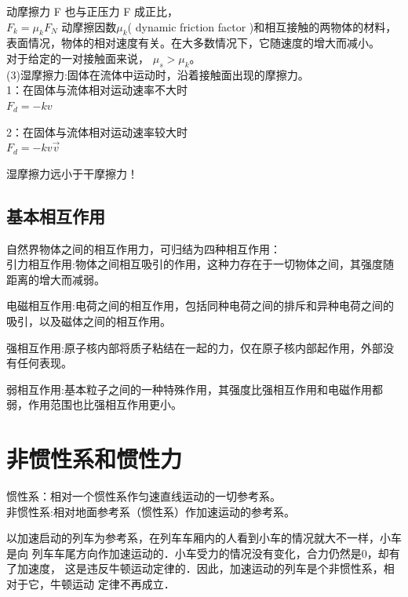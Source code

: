 动摩擦力 F 也与正压力 F 成正比，\\

$	F_{k} = \mu_{k} F_{N}  $
动摩擦因数$\mu_{k}$( dynamic friction factor )和相互接触的两物体的材料，表面情况，物体的相对速度有关。在大多数情况下，它随速度的增大而减小。\\

对于给定的一对接触面来说， $\mu_{s}> \mu_{k}$。\\

(3)湿摩擦力:固体在流体中运动时，沿着接触面出现的摩擦力。\\

1：在固体与流体相对运动速率不大时\\
$	F_{d} = -kv $

2：在固体与流体相对运动速率较大时\\
$	F_{d} =-kv\overrightarrow{v} $

湿摩擦力远小于干摩擦力！
\subsection{基本相互作用}	
自然界物体之间的相互作用力，可归结为四种相互作用：\\

引力相互作用:物体之间相互吸引的作用，这种力存在于一切物体之间，其强度随距离的增大而减弱。


电磁相互作用:电荷之间的相互作用，包括同种电荷之间的排斥和异种电荷之间的吸引，以及磁体之间的相互作用。


强相互作用:原子核内部将质子粘结在一起的力，仅在原子核内部起作用，外部没有任何表现。


弱相互作用:基本粒子之间的一种特殊作用，其强度比强相互作用和电磁作用都弱，作用范围也比强相互作用更小。



\section{非惯性系和惯性力}

\begin{definition}[非惯性系]
    惯性系：相对一个惯性系作匀速直线运动的一切参考系。\\
    非惯性系:相对地面参考系（惯性系）作加速运动的参考系。\\
\end{definition}


\begin{example}[非惯性系理解]
    以加速启动的列车为参考系，在列车车厢内的人看到小车的情况就大不一样，小车是向
    列车车尾方向作加速运动的．小车受力的情况没有变化，合力仍然是0，却有了加速度，
    这是违反牛顿运动定律的．因此，加速运动的列车是个非惯性系，相对于它，牛顿运动
    定律不再成立．
\end{example}


